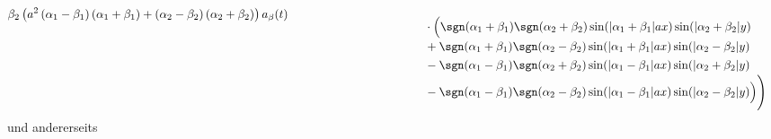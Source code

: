 \begin{align*}
\beta_2
\left(
a^2 \left(\alpha_1 - \beta_1 \right)\left(\alpha_1 + \beta_1 \right)
+ \left(\alpha_2 - \beta_2 \right)\left(\alpha_2 + \beta_2 \right)
\right)
a_{\beta}(t)
\\[-2ex]
&\phantom{=bb-4paatabb\sum\sum.{}cc}
\cdot
\Big(
\sgn(\alpha_1 + \beta_1)\sgn(\alpha_2 + \beta_2)
\sin(|\alpha_1 + \beta_1|ax)\sin(|\alpha_2 + \beta_2|y)
\\[-1ex]
&\phantom{=bb-4paatabb\sum\sum.{}cc}
+
\sgn(\alpha_1 + \beta_1)\sgn(\alpha_2 - \beta_2)
\sin(|\alpha_1 + \beta_1|ax)\sin(|\alpha_2 - \beta_2|y)
\\[-1ex]
&\phantom{=bb-4paatabb\sum\sum.{}cc}
-
\sgn(\alpha_1 - \beta_1)\sgn(\alpha_2 + \beta_2)
\sin(|\alpha_1 - \beta_1|ax)\sin(|\alpha_2 + \beta_2|y)
\\[-1ex]
&\phantom{=bb-4paatabb\sum\sum.{}cc}
-
\sgn(\alpha_1 - \beta_1)\sgn(\alpha_2 - \beta_2)
\sin(|\alpha_1 - \beta_1|ax)\sin(|\alpha_2 - \beta_2|y)
\Big)
\Bigg)
\end{align*}
und andererseits
